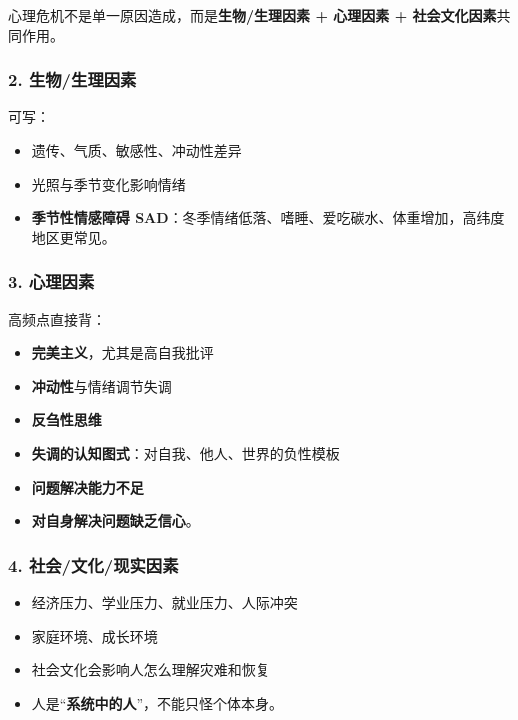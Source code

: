 \documentclass[
  a4paper,
]{ctexart}
\providecommand{\tightlist}{%
  \setlength{\itemsep}{0pt}\setlength{\parskip}{0pt}}
\begin{document}
心理危机不是单一原因造成，而是\textbf{生物/生理因素 + 心理因素 +
社会文化因素}共同作用。

\subsubsection{2.
生物/生理因素}\label{ux751fux7269ux751fux7406ux56e0ux7d20}

可写：

\begin{itemize}
\tightlist
\item
  遗传、气质、敏感性、冲动性差异
\item
  光照与季节变化影响情绪
\item
  \textbf{季节性情感障碍
  SAD}：冬季情绪低落、嗜睡、爱吃碳水、体重增加，高纬度地区更常见。
\end{itemize}

\subsubsection{3. 心理因素}\label{ux5fc3ux7406ux56e0ux7d20}

高频点直接背：

\begin{itemize}
\tightlist
\item
  \textbf{完美主义}，尤其是高自我批评
\item
  \textbf{冲动性}与情绪调节失调
\item
  \textbf{反刍性思维}
\item
  \textbf{失调的认知图式}：对自我、他人、世界的负性模板
\item
  \textbf{问题解决能力不足}
\item
  \textbf{对自身解决问题缺乏信心}。
\end{itemize}

\subsubsection{4.
社会/文化/现实因素}\label{ux793eux4f1aux6587ux5316ux73b0ux5b9eux56e0ux7d20}

\begin{itemize}
\tightlist
\item
  经济压力、学业压力、就业压力、人际冲突
\item
  家庭环境、成长环境
\item
  社会文化会影响人怎么理解灾难和恢复
\item
  人是``\textbf{系统中的人}''，不能只怪个体本身。
\end{itemize}
\end{document}
